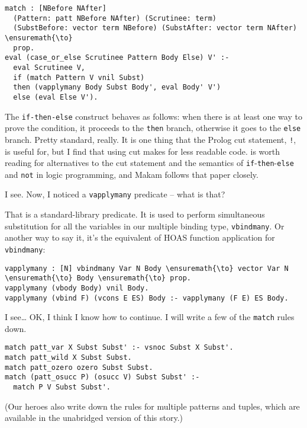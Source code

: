 \begin{verbatim}
match : [NBefore NAfter]
  (Pattern: patt NBefore NAfter) (Scrutinee: term)
  (SubstBefore: vector term NBefore) (SubstAfter: vector term NAfter) \ensuremath{\to}
  prop.
eval (case_or_else Scrutinee Pattern Body Else) V' :-
  eval Scrutinee V,
  if (match Pattern V vnil Subst)
  then (vapplymany Body Subst Body', eval Body' V')
  else (eval Else V').
\end{verbatim}

The \texttt{if-then-else} construct behaves as follows: when there is at
least one way to prove the condition, it proceeds to the \texttt{then}
branch, otherwise it goes to the \texttt{else} branch. Pretty standard,
really. It is one thing that the Prolog cut statement, \texttt{!}, is
useful for, but I find that using cut makes for less readable code.
\citet{kiselyov05backtracking} is worth reading for alternatives to the
cut statement and the semantics of
\texttt{if}-\texttt{then}-\texttt{else} and \texttt{not} in logic
programming, and Makam follows that paper closely.

\heroSTUDENT{} I see. Now, I noticed a \texttt{vapplymany} predicate -- what
is that?

\heroADVISOR{} That is a standard-library predicate. It is used to perform
simultaneous substitution for all the variables in our multiple binding
type, \texttt{vbindmany}. Or another way to say it, it's the equivalent
of HOAS function application for \texttt{vbindmany}:

\begin{verbatim}
vapplymany : [N] vbindmany Var N Body \ensuremath{\to} vector Var N \ensuremath{\to} Body \ensuremath{\to} prop.
vapplymany (vbody Body) vnil Body.
vapplymany (vbind F) (vcons E ES) Body :- vapplymany (F E) ES Body.
\end{verbatim}

\heroSTUDENT{} I see\ldots{} OK, I think I know how to continue. I will write
a few of the \texttt{match} rules down.

\begin{verbatim}
match patt_var X Subst Subst' :- vsnoc Subst X Subst'.
match patt_wild X Subst Subst.
match patt_ozero ozero Subst Subst.
match (patt_osucc P) (osucc V) Subst Subst' :-
  match P V Subst Subst'.
\end{verbatim}

\begin{scenecomment}
(Our heroes also write down the rules for multiple patterns and tuples, which are
available in the unabridged version of this story.)
\end{scenecomment}

\heroNEEDFEEDBACK{}
